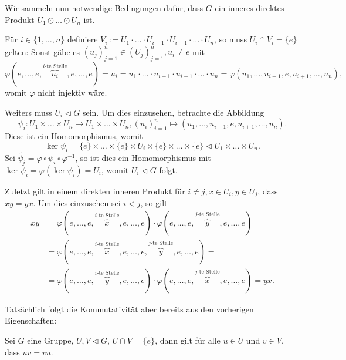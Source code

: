 \begin{remark} \label{remark:inneres-direktes-produkt-notwendig}
    Wir sammeln nun notwendige Bedingungen dafür, dass $G$ ein inneres direktes Produkt $U_1 \odot \hdots \odot U_n$ ist.
    
    Für $i \in \{ 1,\hdots,n \}$ definiere $V_i := U_1 \cdot \hdots \cdot U_{i-1} \cdot U_{i+1} \cdot \hdots \cdot U_n$, so muss $U_i \cap V_i = \{ e \}$ gelten:
    Sonst gäbe es $(u_j)_{j=1}^n \in (U_j)_{j=1}^n, u_i \neq e$ mit
    $$ \varphi(e, \hdots, e, \overbrace{u_i}^{\textrm{$i$-te Stelle}}, e, \hdots, e) = u_i = u_1 \cdot \hdots \cdot u_{i-1} \cdot u_{i+1} \cdot \hdots \cdot u_n = \varphi(u_1, \hdots, u_{i-1}, e, u_{i+1}, \hdots, u_n), $$
    womit $\varphi$ nicht injektiv wäre.

    Weiters muss $U_i \vartriangleleft G$ sein. Um dies einzusehen, betrachte die Abbildung
    $$ \psi_i : U_1 \times \hdots \times U_n \to U_1 \times \hdots \times U_n, (u_i)_{i=1}^n \mapsto (u_1, \hdots, u_{i-1}, e, u_{i+1}, \hdots, u_n). $$
    Diese ist ein Homomorphismus, womit
    $$ \ker \psi_i = \{e\} \times \hdots \times \{e\} \times U_i \times \{e\} \times \hdots \times \{e\} \vartriangleleft U_1 \times \hdots \times U_n. $$
    Sei $\widetilde{\psi_i} = \varphi \circ \psi_i \circ \varphi^{-1}$, so ist dies ein Homomorphismus mit $\ker \widetilde{\psi_i} = \varphi(\ker \psi_i) = U_i$, womit $U_i \vartriangleleft G$ folgt.

    Zuletzt gilt in einem direkten inneren Produkt für $i \neq j, x \in U_i, y \in U_j$, dass $xy = yx$. Um dies einzusehen sei \obda $i < j$, so gilt
    \begin{align*}        
        xy &= \varphi(e, \hdots, e, \overbrace{x}^{\textrm{$i$-te Stelle}}, e, \hdots, e) \cdot \varphi(e, \hdots, e, \overbrace{y}^{\textrm{$j$-te Stelle}}, e, \hdots, e) =  \\ &= \varphi(e, \hdots, e, \overbrace{x}^{\textrm{$i$-te Stelle}}, e, \hdots, e, \overbrace{y}^{\textrm{$j$-te Stelle}}, e, \hdots, e) = \\ &= \varphi(e, \hdots, e, \overbrace{y}^{\textrm{$i$-te Stelle}}, e, \hdots, e) \cdot \varphi(e, \hdots, e, \overbrace{x}^{\textrm{$j$-te Stelle}}, e, \hdots, e) = yx.
    \end{align*}
\end{remark}

Tatsächlich folgt die Kommutativität aber bereits aus den vorherigen Eigenschaften:

\begin{lemma} \label{lemma:gruppe-normalteiler-kommutativ}
    Sei $G$ eine Gruppe, $U, V \vartriangleleft G$, $U \cap V = \{ e \}$, dann gilt für alle $u \in U$ und $v \in V$, dass $uv = vu$.
\end{lemma}

